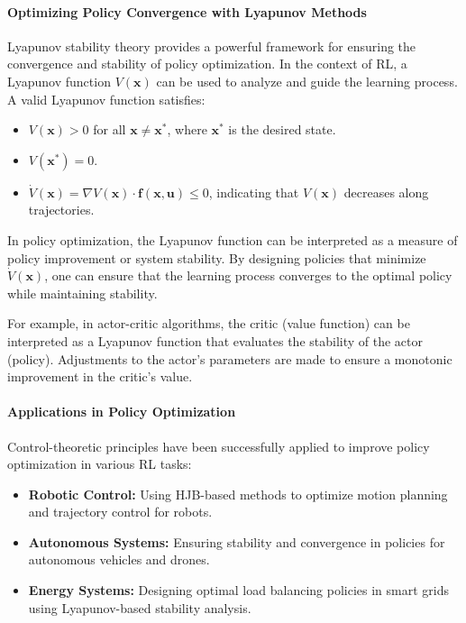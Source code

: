 \documentclass{IEEEojcsys}
\begin{document}
\paragraph{Optimizing Policy Convergence with Lyapunov Methods}
Lyapunov stability theory provides a powerful framework for ensuring the convergence and stability of policy optimization. In the context of RL, a Lyapunov function $V(\mathbf{x})$ can be used to analyze and guide the learning process. A valid Lyapunov function satisfies:
\begin{itemize}
    \item $V(\mathbf{x}) > 0$ for all $\mathbf{x} \neq \mathbf{x}^*$, where $\mathbf{x}^*$ is the desired state.
    \item $V(\mathbf{x}^*) = 0$.
    \item $\dot{V}(\mathbf{x}) = \nabla V(\mathbf{x}) \cdot \mathbf{f}(\mathbf{x}, \mathbf{u}) \leq 0$, indicating that $V(\mathbf{x})$ decreases along trajectories.
\end{itemize}

In policy optimization, the Lyapunov function can be interpreted as a measure of policy improvement or system stability. By designing policies that minimize $\dot{V}(\mathbf{x})$, one can ensure that the learning process converges to the optimal policy while maintaining stability.

For example, in actor-critic algorithms, the critic (value function) can be interpreted as a Lyapunov function that evaluates the stability of the actor (policy). Adjustments to the actor's parameters are made to ensure a monotonic improvement in the critic's value.

\paragraph{Applications in Policy Optimization}
Control-theoretic principles have been successfully applied to improve policy optimization in various RL tasks:
\begin{itemize}
    \item \textbf{Robotic Control:} Using HJB-based methods to optimize motion planning and trajectory control for robots.
    \item \textbf{Autonomous Systems:} Ensuring stability and convergence in policies for autonomous vehicles and drones.
    \item \textbf{Energy Systems:} Designing optimal load balancing policies in smart grids using Lyapunov-based stability analysis.
\end{itemize}
\end{document}
